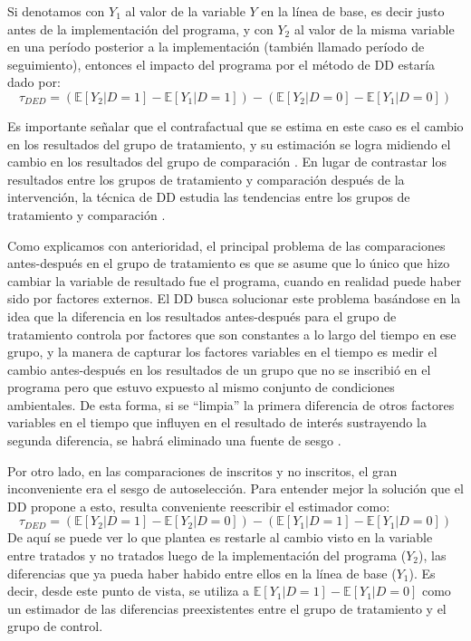 \documentclass[../../main.tex]{subfiles}
\begin{document}
Si denotamos con \(Y_1\) al valor de la variable \(Y\) en la línea de base, es decir justo antes de la implementación del programa, y con \(Y_2\) al valor de la misma variable en una período posterior a la implementación (también llamado período de seguimiento), entonces el impacto del programa por el método de DD estaría dado por:
\begin{equation}
    \tau_{DED} = 
        \left(
            \mathbb{E}\left[Y_2|D=1\right] - \mathbb{E}\left[Y_1|D=1\right]
        \right) -
        \left(
            \mathbb{E}\left[Y_2|D=0\right] - \mathbb{E}\left[Y_1|D=0\right]
        \right)
        \label{eq:dif-en-dif-1}
\end{equation}

Es importante señalar que el contrafactual que se estima en este caso es el cambio en los resultados del grupo de tratamiento, y su estimación se logra midiendo el cambio en los resultados del grupo de comparación \cite{gertler-2016}. En lugar de contrastar los resultados entre los grupos de tratamiento y comparación después de la intervención, la técnica de DD estudia las tendencias entre los grupos de tratamiento y comparación \cite{gertler-2016}.

Como explicamos con anterioridad, el principal problema de las comparaciones antes-después en el grupo de tratamiento es que se asume que lo único que hizo cambiar la variable de resultado fue el programa, cuando en realidad puede haber sido por factores externos. El DD busca solucionar este problema basándose en la idea que la diferencia en los resultados antes-después para el grupo de tratamiento controla por factores que son constantes a lo largo del tiempo en ese grupo, y la manera de capturar los factores variables en el tiempo es medir el cambio antes-después en los resultados de un grupo que no se inscribió en el programa pero que estuvo expuesto al mismo conjunto de condiciones ambientales. De esta forma, si se ``limpia'' la primera diferencia de otros factores variables en el tiempo que influyen en el resultado de interés sustrayendo la segunda diferencia, se habrá eliminado una fuente de sesgo \cite{gertler-2016}.

Por otro lado, en las comparaciones de inscritos y no inscritos, el gran inconveniente era el sesgo de autoselección. Para entender mejor la solución que el DD propone a esto, resulta conveniente reescribir el estimador como:
\begin{equation}
    \tau_{DED} = 
        \left(
            \mathbb{E}\left[Y_2|D=1\right] - \mathbb{E}\left[Y_2|D=0\right]
        \right) -
        \left(
            \mathbb{E}\left[Y_1|D=1\right] - \mathbb{E}\left[Y_1|D=0\right]
        \right)
        \label{eq:dif-en-dif-2}
\end{equation}
De aquí se puede ver lo que plantea es restarle al cambio visto en la variable entre tratados y no tratados luego de la implementación del programa (\(Y_2\)), las diferencias que ya pueda haber habido entre ellos en la línea de base (\(Y_1\)). Es decir, desde este punto de vista, se utiliza a \(\mathbb{E}\left[Y_1|D=1\right] - \mathbb{E}\left[Y_1|D=0\right]\) como un estimador de las diferencias preexistentes entre el grupo de tratamiento y el grupo de control.
\end{document}
